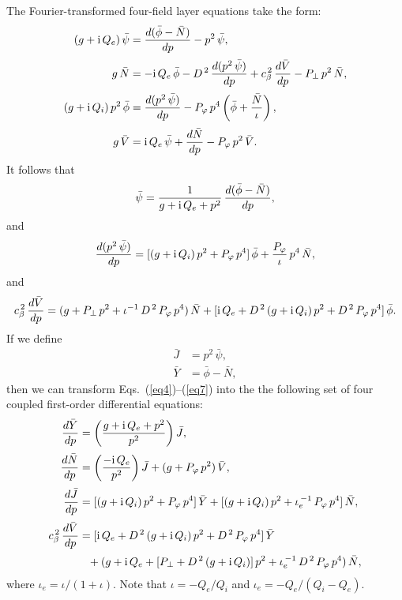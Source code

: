 \documentclass[12pt,prb,aps,notitlepage]{revtex4-1}
\begin{document}
The  Fourier-transformed four-field layer equations take the form:
\begin{align}
(g+{\rm i}\,Q_e)\,\bar{\psi} &= \frac{d(\bar{\phi}-\bar{N})}{dp} - p^2\,\bar{\psi},\\[0.5ex]
g\,\bar{N} &= -{\rm i}\,Q_e\,\bar{\phi} - D^{\,2}\,\frac{d(p^2\,\bar{\psi})}{dp} + c_\beta^{\,2}\,\frac{d\bar{V}}{dp} - P_\perp\,p^2\,\bar{N},\\[0.5ex]
(g+ {\rm i}\,Q_i)\,p^2\,\bar{\phi} &= \frac{d(p^2\,\bar{\psi})}{dp} - P_\varphi\,p^4\left(\bar{\phi}+ \frac{\bar{N}}{\iota}\right),\\[0.5ex]
g\,\bar{V} &= {\rm i}\,Q_e\,\bar{\psi} + \frac{d\bar{N}}{dp} - P_\varphi\,p^2\,\bar{V}.\label{eq4}
\end{align}
It follows that
\begin{equation}
\bar{\psi} = \frac{1}{g+{\rm i}\,Q_e+p^2}\,\frac{d(\bar{\phi}-\bar{N})}{dp},
\end{equation}
and
\begin{equation}
\frac{d(p^2\,\bar{\psi})}{dp} = [(g+{\rm i}\,Q_i)\,p^2 + P_\varphi\,p^4]\,\bar{\phi} + \frac{P_\varphi}{\iota}\,p^4\,\bar{N},
\end{equation}
and
\begin{equation}
c_\beta^{\,2}\,\frac{d\bar{V}}{dp} = (g + P_\perp\,p^2+ \iota^{-1}\,D^{\,2}\,P_\varphi\,p^4)\,\bar{N}+ [
{\rm i}\,Q_e + D^{\,2}\,(g+{\rm i}\,Q_i)\,p^2 + D^{\,2}\,P_\varphi\,p^4]\,\bar{\phi}.\label{eq7}
\end{equation}
If we define 
\begin{align}
\bar{J}&= p^2\,\bar{\psi},\\[0.5ex]
\bar{Y} &= \bar{\phi}-\bar{N},
\end{align}
then we can transform Eqs.~(\ref{eq4})--(\ref{eq7}) into the  the following set of four coupled first-order differential equations:
\begin{align}\label{e1}
\frac{d\bar{Y}}{dp} &= \left(\frac{g+{\rm i}\,Q_e+p^2}{p^2}\right)\bar{J},\\[0.5ex]
\frac{d\bar{N}}{dp} &= \left(\frac{-{\rm i}\,Q_e}{p^2}\right)\bar{J} + (g + P_\varphi\,p^2)\,\bar{V},\\[0.5ex]
\frac{d\bar{J}}{dp} &= [(g+{\rm i}\,Q_i)\,p^2 + P_\varphi\,p^4]\,\bar{Y}
+ [(g+{\rm i}\,Q_i)\,p^2 + \iota_e^{\,-1}\,P_\varphi\,p^4]\,\bar{N},\\[0.5ex]
c_\beta^{\,2}\,\frac{d\bar{V}}{dp} &= [{\rm i}\,Q_e+ D^{\,2}\,(g+{\rm i}\,Q_i)\,p^2 + D^{\,2}\,P_\varphi\,p^4]\,\bar{Y}
\nonumber\\[0.5ex]&\phantom{=} +(g+{\rm i}\,Q_e + [P_\perp+ D^{\,2}\,(g + {\rm i}\,Q_i)]\,p^2 + \iota_e^{\,-1}\,D^{\,2}\,P_\varphi\,p^4)\,\bar{N},\label{e4}
\end{align}
where $\iota_e=\iota/(1+\iota)$. Note that $\iota = -Q_e/Q_i$ and $\iota_e= -Q_e/(Q_i-Q_e)$. 
\end{document}
